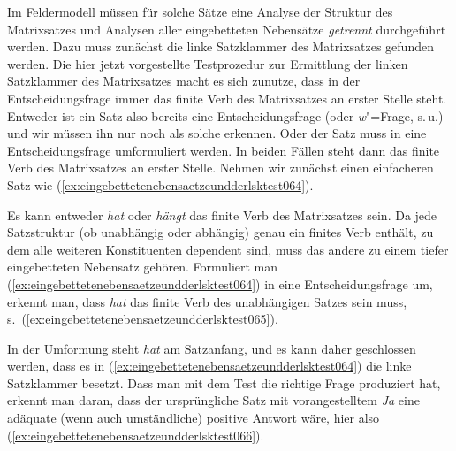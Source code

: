 \begin{exe}
  \ex\label{ex:eingebettetenebensaetzeundderlsktest061}
  \begin{xlist}
  \end{xlist}
\end{exe}

Im Feldermodell müssen für solche Sätze eine Analyse der Struktur des Matrixsatzes und Analysen aller eingebetteten Nebensätze \textit{getrennt} durchgeführt werden.
Dazu muss zunächst die linke Satzklammer des Matrixsatzes gefunden werden.
Die hier jetzt vorgestellte Testprozedur zur Ermittlung der linken Satzklammer des Matrixsatzes macht es sich zunutze, dass in der Entscheidungsfrage immer das finite Verb des Matrixsatzes an erster Stelle steht.
Entweder ist ein Satz also bereits eine Entscheidungsfrage (oder \textit{w}"=Frage, s.\,u.) und wir müssen ihn nur noch als solche erkennen.
Oder der Satz muss in eine Entscheidungsfrage umformuliert werden.
In beiden Fällen steht dann das finite Verb des Matrixsatzes an erster Stelle.
Nehmen wir zunächst einen einfacheren Satz wie (\ref{ex:eingebettetenebensaetzeundderlsktest064}).

\begin{exe}
\end{exe}

Es kann entweder \textit{hat} oder \textit{hängt} das finite Verb des Matrixsatzes sein.
Da jede Satzstruktur (ob unabhängig oder abhängig) genau ein finites Verb enthält, zu dem alle weiteren Konstituenten dependent sind, muss das andere zu einem tiefer eingebetteten Nebensatz gehören.
Formuliert man (\ref{ex:eingebettetenebensaetzeundderlsktest064}) in eine Entscheidungsfrage um, erkennt man, dass \textit{hat} das finite Verb des unabhängigen Satzes sein muss, s.\ (\ref{ex:eingebettetenebensaetzeundderlsktest065}).

\begin{exe}
\end{exe}

In der Umformung steht \textit{hat} am Satzanfang, und es kann daher geschlossen werden, dass es in (\ref{ex:eingebettetenebensaetzeundderlsktest064}) die linke Satzklammer besetzt.
Dass man mit dem Test die richtige Frage produziert hat, erkennt man daran, dass der ursprüngliche Satz mit vorangestelltem \textit{Ja} eine adäquate (wenn auch umständliche) positive Antwort wäre, hier also (\ref{ex:eingebettetenebensaetzeundderlsktest066}).

